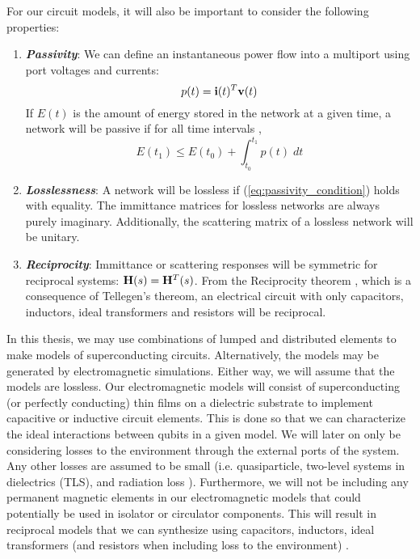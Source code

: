 For our circuit models, it will also be important to consider the following properties:
\begin{enumerate}
    \item {\bf \textit{Passivity}}: We can define an instantaneous power flow into a multiport using port voltages and currents:
    \begin{equation}
        p(t) = \vb{i}(t)^T \vb{v}(t)
    \end{equation}
    If $E(t)$ is the amount of energy stored in the network at a given time, a network will be passive if for all time intervals \cite[Chapter 9.1]{passive_macromodeling},
    \begin{equation}\label{eq:passivity_condition}
        E(t_1) \leq E(t_0) + \int_{t_0}^{t_1} p(t)\; dt
    \end{equation}
    \item {\bf \textit{Losslessness}}: A network will be lossless if (\ref{eq:passivity_condition}) holds with equality. The immittance matrices for lossless networks are always purely imaginary. Additionally, the scattering matrix of a lossless network will be unitary.
    \item {\bf \textit{Reciprocity}}: Immittance or scattering responses will be symmetric for reciprocal systems: $\vb{H}(s)=\vb{H}^T(s)$. From the Reciprocity theorem \cite[Chapter 16.4]{desoer_kuh}, which is a consequence of Tellegen's thereom, an electrical circuit with only capacitors, inductors, ideal transformers and resistors will be reciprocal.
\end{enumerate}

In this thesis, we may use combinations of lumped and distributed elements to make models of superconducting circuits. Alternatively, the models may be generated by electromagnetic simulations. Either way, we will assume that the models are lossless. Our electromagnetic models will consist of superconducting (or perfectly conducting) thin films on a dielectric substrate to implement capacitive or inductive circuit elements. This is done so that we can characterize the ideal interactions between qubits in a given model. We will later on only be considering losses to the environment through the external ports of the system. Any other losses are assumed to be small (i.e. quasiparticle, two-level systems in dielectrics (TLS), and radiation loss \cite{disentangling_losses}). Furthermore, we will not be including any permanent magnetic elements in our electromagnetic models that could potentially be used in isolator or circulator components. This will result in reciprocal models that we can synthesize using capacitors, inductors, ideal transformers (and resistors when including loss to the environment) \cite{tellegen_gyrator}.